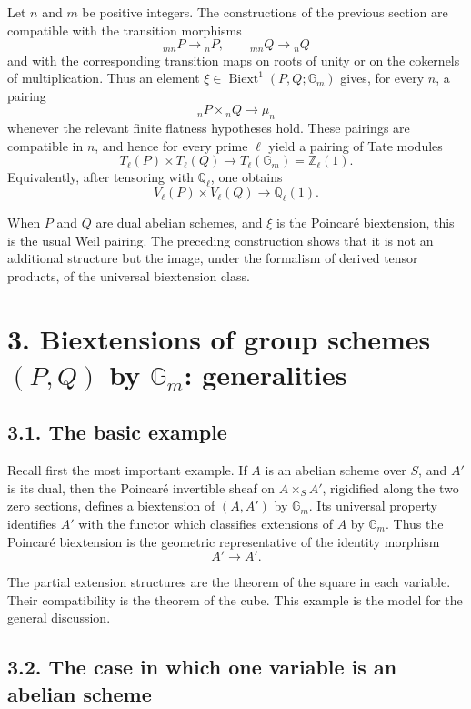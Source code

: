 \documentclass[11pt]{article}
\theoremstyle{plain}
\theoremstyle{definition}
\theoremstyle{remark}
\newcommand{\bQ}{\mathbb Q}
\newcommand{\bZ}{\mathbb Z}
\DeclareMathOperator{\Biext}{Biext}
\newcommand{\Gm}{\mathbb G_m}
\begin{document}
Let \(n\) and \(m\) be positive integers. The constructions of the previous
section are compatible with the transition morphisms
\[
{}_{mn}P\longrightarrow {}_nP,\qquad {}_{mn}Q\longrightarrow {}_nQ
\]
and with the corresponding transition maps on roots of unity or on the
cokernels of multiplication. Thus an element
\(\xi\in\Biext^1(P,Q;\Gm)\) gives, for every \(n\), a pairing
\[
{}_nP\times {}_nQ\longrightarrow \mu_n
\]
whenever the relevant finite flatness hypotheses hold. These pairings are
compatible in \(n\), and hence for every prime \(\ell\) yield a pairing of Tate
modules
\[
T_\ell(P)\times T_\ell(Q)\longrightarrow T_\ell(\Gm)=\bZ_\ell(1).
\]
Equivalently, after tensoring with \(\bQ_\ell\), one obtains
\[
V_\ell(P)\times V_\ell(Q)\longrightarrow \bQ_\ell(1).
\]

When \(P\) and \(Q\) are dual abelian schemes, and \(\xi\) is the Poincaré
biextension, this is the usual Weil pairing. The preceding construction shows
that it is not an additional structure but the image, under the formalism of
derived tensor products, of the universal biextension class.

\section*{3. Biextensions of group schemes \((P,Q)\) by \(\Gm\): generalities}

\subsection*{3.1. The basic example}

Recall first the most important example. If \(A\) is an abelian scheme over
\(S\), and \(A'\) is its dual, then the Poincaré invertible sheaf on
\(A\times_S A'\), rigidified along the two zero sections, defines a biextension
of \((A,A')\) by \(\Gm\). Its universal property identifies \(A'\) with the
functor which classifies extensions of \(A\) by \(\Gm\). Thus the Poincaré
biextension is the geometric representative of the identity morphism
\[
A'\longrightarrow A'.
\]

The partial extension structures are the theorem of the square in each variable.
Their compatibility is the theorem of the cube. This example is the model for the
general discussion.

\subsection*{3.2. The case in which one variable is an abelian scheme}
\end{document}
